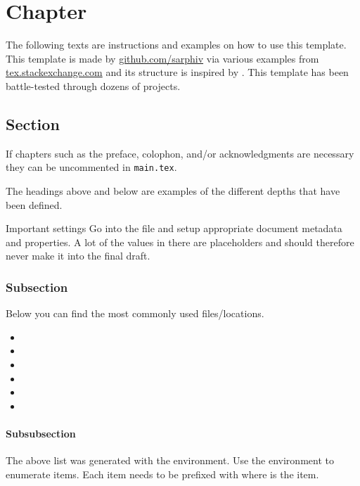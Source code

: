 \chapter{Chapter}
The following texts are instructions and examples on how to use this template.
This template is made by \href{https://github.com/sarphiv/}{github.com/sarphiv} via various examples from \href{https://tex.stackexchange.com}{tex.stackexchange.com}
and its structure is inspired by .
This template has been battle-tested through dozens of projects.

\section{Section}
If chapters such as the preface, colophon, and/or acknowledgments are necessary
they can be uncommented in \lstinline|main.tex|.

The headings above and below are examples of the different depths that have been defined.

\begin{highlightbox*}{Important settings}
Go into the  file and setup appropriate document metadata and properties.
A lot of the values in there are placeholders and should therefore never make it into the final draft.
\end{highlightbox*}

\subsection{Subsection}
Below you can find the most commonly used files/locations.
\begin{itemize}
    \item {}
    \item {}
    \item {}
    \item {}
    \item {}
    \item {}
\end{itemize}

\subsubsection{Subsubsection}
The above list was generated with the  environment.
Use the  environment to enumerate items.
Each item needs to be prefixed with 
where  is the item.

